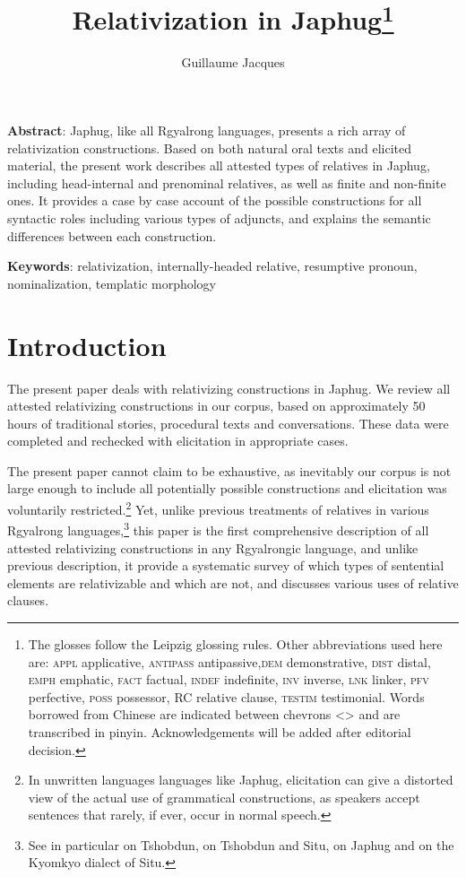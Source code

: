 \documentclass[oldfontcommands,oneside,a4paper,11pt]{article}
\begin{document}
 

\title{Relativization in Japhug\footnote{
The glosses follow the Leipzig glossing rules. Other abbreviations used here are: \textsc{appl} applicative, \textsc{antipass} antipassive,\textsc{dem} demonstrative, \textsc{dist} distal, \textsc{emph} emphatic, \textsc{fact} factual, \textsc{indef} indefinite, \textsc{inv} inverse,  \textsc{lnk} linker, \textsc{pfv} perfective, \textsc{poss} possessor, RC relative clause, \textsc{testim} testimonial. Words borrowed from Chinese are indicated between chevrons <> and are transcribed in pinyin. %
Acknowledgements will be added after editorial decision. %
} }
\author{Guillaume Jacques}
\maketitle
\linenumbers
\textbf{Abstract}: Japhug, like all Rgyalrong languages, presents a rich array of relativization constructions. Based on both natural oral texts and elicited material, the present work  describes all attested types of relatives in Japhug, including head-internal and prenominal relatives, as well as finite and non-finite ones. It provides a case by case account of the possible constructions for all syntactic roles including various types of adjuncts, and explains the semantic differences between each construction.



\textbf{Keywords}: relativization, internally-headed relative, resumptive pronoun, nominalization, templatic morphology
\section{Introduction}
The present paper deals with relativizing constructions in Japhug. 
We review all attested relativizing constructions in our corpus, based on approximately 50 hours of traditional stories, procedural texts and conversations. These data were completed and rechecked with elicitation in appropriate cases. 

The present paper  cannot claim to be exhaustive, as inevitably our corpus is not large enough to include all potentially possible constructions and elicitation was voluntarily restricted.\footnote{In unwritten languages languages like Japhug, elicitation can give a distorted view of the actual use of grammatical constructions, as speakers accept sentences that rarely, if ever, occur in normal speech.  }  Yet, unlike previous treatments of relatives in various Rgyalrong languages,\footnote{See in particular    \citet{jackson06guanxiju} on Tshobdun,  \citet{jacksonlin07} on Tshobdun and Situ, \citet{jacques08} on Japhug and  \citet{prins11kyomkyo} on the Kyomkyo dialect of Situ.} this paper is the first comprehensive description of all attested relativizing constructions in any Rgyalrongic language, and unlike previous description, it provide a systematic survey of which types of sentential elements are relativizable and which are not, and discusses various uses of relative clauses.
\end{document}
